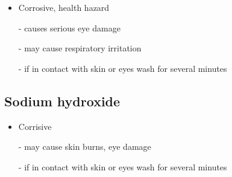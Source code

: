 \documentclass[a4paper, british]{article}
\begin{document}
\begin{appendices}
\begin{itemize}
    \item Corrosive, health hazard
    \item[-] causes serious eye damage
    \item[-] may cause respiratory irritation
    \item[-] if in contact with skin or eyes wash for several minutes  
\end{itemize}

\subsection*{Sodium hydroxide}

\begin{itemize}
    \item Corrisive
    \item[-] may cause skin burns, eye damage
    \item[-] if in contact with skin or eyes wash for several minutes  
\end{itemize}

\end{appendices}
\end{document}
